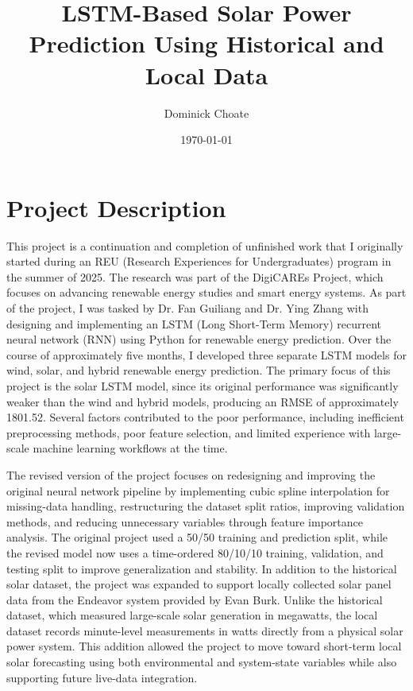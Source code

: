 \documentclass[11pt]{article}
\title{LSTM-Based Solar Power Prediction Using Historical and Local Data}
\author{Dominick Choate}
\date{\today}
\begin{document}
\maketitle

\section{Project Description}

	This project is a continuation and completion of unfinished work that I originally started during an REU (Research Experiences for Undergraduates) program in the summer of 2025. The research was part of the DigiCAREs Project, which focuses on advancing renewable energy studies and smart energy systems. As part of the project, I was tasked by Dr. Fan Guiliang and Dr. Ying Zhang with designing and implementing an LSTM (Long Short-Term Memory) recurrent neural network (RNN) using Python for renewable energy prediction. Over the course of approximately five months, I developed three separate LSTM models for wind, solar, and hybrid renewable energy prediction. The primary focus of this project is the solar LSTM model, since its original performance was significantly weaker than the wind and hybrid models, producing an RMSE of approximately 1801.52. Several factors contributed to the poor performance, including inefficient preprocessing methods, poor feature selection, and limited experience with large-scale machine learning workflows at the time.

	The revised version of the project focuses on redesigning and improving the original neural network pipeline by implementing cubic spline interpolation for missing-data handling, restructuring the dataset split ratios, improving validation methods, and reducing unnecessary variables through feature importance analysis. The original project used a 50/50 training and prediction split, while the revised model now uses a time-ordered 80/10/10 training, validation, and testing split to improve generalization and stability. In addition to the historical solar dataset, the project was expanded to support locally collected solar panel data from the Endeavor system provided by Evan Burk. Unlike the historical dataset, which measured large-scale solar generation in megawatts, the local dataset records minute-level measurements in watts directly from a physical solar power system. This addition allowed the project to move toward short-term local solar forecasting using both environmental and system-state variables while also supporting future live-data integration.
\end{document}
